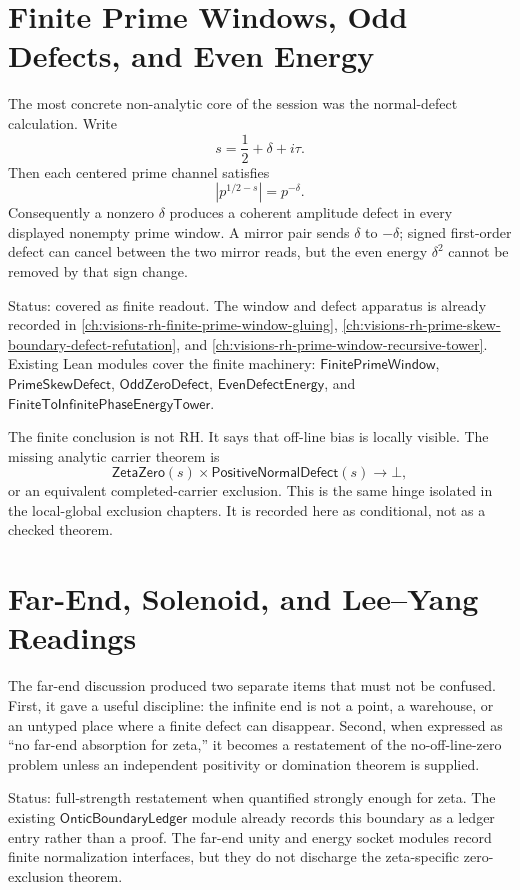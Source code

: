 \section{Finite Prime Windows, Odd Defects, and Even Energy}
\label{sec:rh-ledger-prime-window-energy}

The most concrete non-analytic core of the session was the normal-defect
calculation.  Write
$$
s=\frac12+\delta+i\tau.
$$
Then each centered prime channel satisfies
$$
|p^{1/2-s}|=p^{-\delta}.
$$
Consequently a nonzero $\delta$ produces a coherent amplitude defect in
every displayed nonempty prime window.  A mirror pair sends
$\delta$ to $-\delta$; signed first-order defect can cancel between the two
mirror reads, but the even energy $\delta^2$ cannot be removed by that sign
change.

Status: covered as finite readout.  The window and defect apparatus is
already recorded in \autoref{ch:visions-rh-finite-prime-window-gluing},
\autoref{ch:visions-rh-prime-skew-boundary-defect-refutation}, and
\autoref{ch:visions-rh-prime-window-recursive-tower}.  Existing Lean modules
cover the finite machinery:
$\mathsf{FinitePrimeWindow}$, $\mathsf{PrimeSkewDefect}$,
$\mathsf{OddZeroDefect}$, $\mathsf{EvenDefectEnergy}$, and
$\mathsf{FiniteToInfinitePhaseEnergyTower}$.

The finite conclusion is not RH.  It says that off-line bias is locally
visible.  The missing analytic carrier theorem is
$$
\mathsf{ZetaZero}(s)
\times
\mathsf{PositiveNormalDefect}(s)
\to
\bot,
$$
or an equivalent completed-carrier exclusion.  This is the same hinge
isolated in the local-global exclusion chapters.  It is recorded here as
conditional, not as a checked theorem.

\section{Far-End, Solenoid, and Lee--Yang Readings}
\label{sec:rh-ledger-far-end-solenoid-lee-yang}

The far-end discussion produced two separate items that must not be
confused.  First, it gave a useful discipline: the infinite end is not a
point, a warehouse, or an untyped place where a finite defect can disappear.
Second, when expressed as ``no far-end absorption for zeta,'' it becomes a
restatement of the no-off-line-zero problem unless an independent positivity
or domination theorem is supplied.

Status: full-strength restatement when quantified strongly enough for zeta.  The
existing $\mathsf{OnticBoundaryLedger}$ module already records this boundary
as a ledger entry rather than a proof.  The far-end unity and energy socket
modules record finite normalization interfaces, but they do not discharge
the zeta-specific zero-exclusion theorem.

